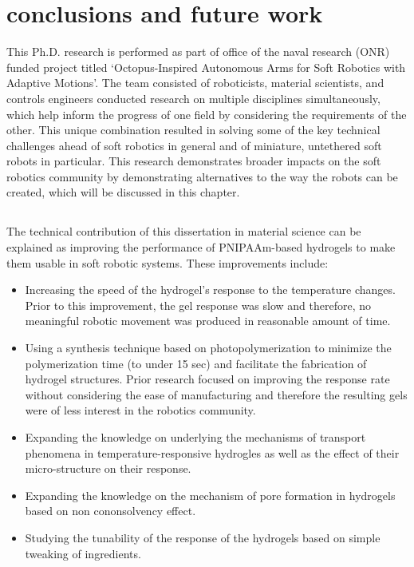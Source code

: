 \graphicspath{{Images/conclusion/}}

\chapter{conclusions and future work}
\label{chap:conclusion}
This Ph.D. research is performed as part of office of the naval research (ONR) funded project titled `Octopus-Inspired Autonomous Arms for Soft Robotics with Adaptive Motions'. The team consisted of roboticists, material scientists, and controls engineers conducted research on multiple disciplines simultaneously, which help inform the progress of one field by considering the requirements of the other. This unique combination resulted in solving some of the key technical challenges ahead of soft robotics in general and of miniature, untethered soft robots in particular. This research demonstrates broader impacts on the soft robotics community by demonstrating alternatives to the way the robots can be created, which will be discussed in this chapter.
\section{}
The technical contribution of this dissertation in material science can be explained as improving the performance of PNIPAAm-based hydrogels to make them usable in soft robotic systems. These improvements include:
\begin{itemize}
 \item Increasing the speed of the hydrogel's response to the temperature changes. Prior to this improvement, the gel response was slow and therefore, no meaningful robotic movement was produced in reasonable amount of time. 
 \item Using a synthesis technique based on photopolymerization to minimize the polymerization time (to under 15 sec) and facilitate the fabrication of hydrogel structures. Prior research focused on improving the response rate without considering the ease of manufacturing and therefore the resulting gels were of less interest in the robotics community.
 \item Expanding the knowledge on underlying the mechanisms of transport phenomena in temperature-responsive hydrogles as well as the effect of their micro-structure on their response. 
 \item Expanding the knowledge on the mechanism of pore formation in hydrogels based on non cononsolvency effect. 
 \item Studying the tunability of the response of the hydrogels based on simple tweaking of ingredients. 
\end{itemize}
	
